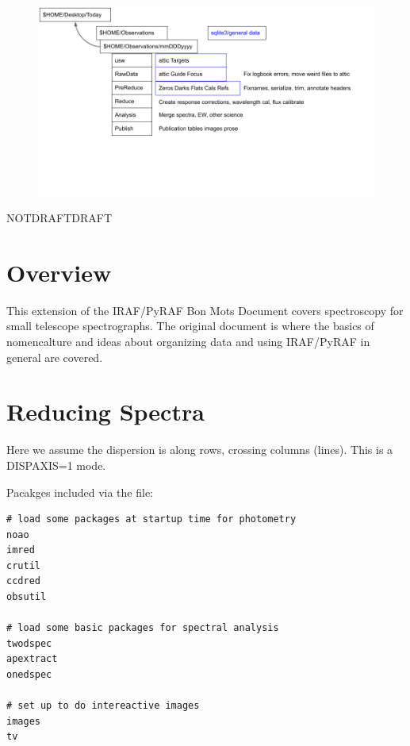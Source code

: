 \documentclass[letter,11pt,oneside]{article}
\def\documentisdraft{NOTDRAFT}
\def\drafttest{DRAFT}
\newcommand{\dhlv}[1]{{\color{verbcolor}{#1}}}
\begin{document}
\vskip 2cm
\begin{figure}[h!]
\centering
\includegraphics[width=.8\textwidth]{images/Overview1.png}
\label{figure:basicpipeline}
\end{figure}

\clearpage

\setcounter{section}{0}

\ifx\documentisdraft\drafttest
\linenumbers    %
\fi

\clearpage
{}


\section*{Overview}

This extension of the IRAF/PyRAF Bon Mots Document covers spectroscopy
for small telescope spectrographs. The original document is where the
basics of nomencalture and ideas about organizing data and using
IRAF/PyRAF in general are covered.


\section{Reducing Spectra}

Here we assume the dispersion is along rows, crossing columns (lines).
This is a DISPAXIS=1 mode.

Pacakges included via the \dhlv{$\sim$/iraf/loginuser.cl} file:

\begingroup \fontsize{10pt}{10pt}
\selectfont
\begin{verbatim} 
# load some packages at startup time for photometry
noao
imred
crutil
ccdred
obsutil

# load some basic packages for spectral analysis
twodspec
apextract
onedspec  

# set up to do intereactive images
images
tv     
\end{verbatim}
\endgroup
\end{document}
